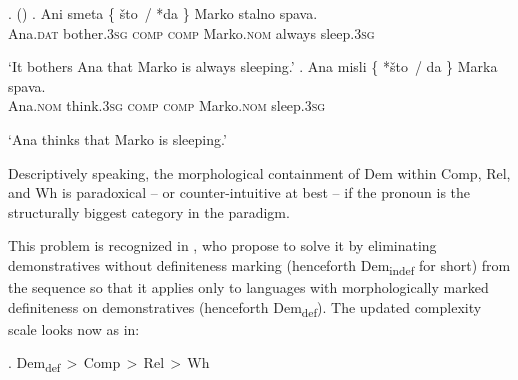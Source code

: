 \ex.  (\citealt[114]{Mihalicek})
\ag. Ani smeta \{ {\v{s}to \,/} {*da \}} Marko stalno spava.\\
Ana.\textsc{dat} bother.\textsc{3sg} {} {\textsc{comp}} {\textsc{\phantom{l}comp}}  Marko.\textsc{nom} always sleep.\textsc{3sg}\\
\strut `It bothers Ana that Marko is always sleeping.' 
\bg. Ana misli \{ {*\v{s}to \,/} {da \}} Marka spava.\\
Ana.\textsc{nom} think.\textsc{3sg} {} {\phantom{l}\textsc{comp}} {\textsc{comp}}  Marko.\textsc{nom} sleep.\textsc{3sg}\\
\strut `Ana thinks that Marko is sleeping.'

\noindent Descriptively speaking, the morphological containment of Dem within Comp, Rel, and Wh is paradoxical -- or counter-intuitive at best -- if the  pronoun is the structurally biggest category in the paradigm.
\par
This problem is recognized in \cite{BaunazLander2018}, who propose to solve it by eliminating demonstratives without definiteness marking (henceforth Dem\textsubscript{indef} for short) from the sequence so that it applies only to languages with morphologically marked definiteness on demonstratives (henceforth Dem\textsubscript{def}). The updated complexity scale looks now as in:

\ex.\label{dem-def} Dem\textsubscript{def}\,$>$\,Comp\,$>$\,Rel\,$>$\,Wh

